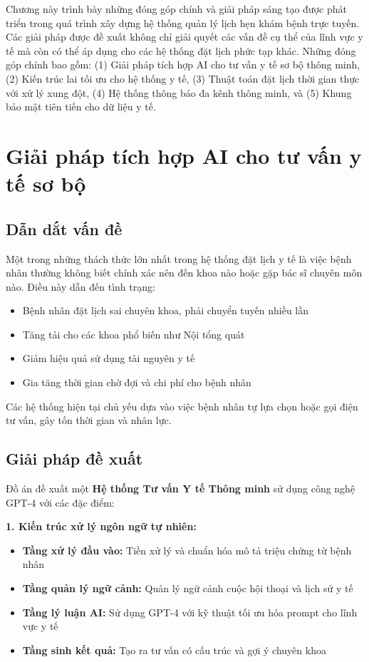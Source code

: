 \documentclass[../DoAn.tex]{subfiles}
\begin{document}
Chương này trình bày những đóng góp chính và giải pháp sáng tạo được phát triển trong quá trình xây dựng hệ thống quản lý lịch hẹn khám bệnh trực tuyến. Các giải pháp được đề xuất không chỉ giải quyết các vấn đề cụ thể của lĩnh vực y tế mà còn có thể áp dụng cho các hệ thống đặt lịch phức tạp khác. Những đóng góp chính bao gồm: (1) Giải pháp tích hợp AI cho tư vấn y tế sơ bộ thông minh, (2) Kiến trúc lai tối ưu cho hệ thống y tế, (3) Thuật toán đặt lịch thời gian thực với xử lý xung đột, (4) Hệ thống thông báo đa kênh thông minh, và (5) Khung bảo mật tiên tiến cho dữ liệu y tế.

\section{Giải pháp tích hợp AI cho tư vấn y tế sơ bộ}
\label{section:5.1}

\subsection{Dẫn dắt vấn đề}

Một trong những thách thức lớn nhất trong hệ thống đặt lịch y tế là việc bệnh nhân thường không biết chính xác nên đến khoa nào hoặc gặp bác sĩ chuyên môn nào. Điều này dẫn đến tình trạng:

\begin{itemize}
    \item Bệnh nhân đặt lịch sai chuyên khoa, phải chuyển tuyến nhiều lần
    \item Tăng tải cho các khoa phổ biến như Nội tổng quát
    \item Giảm hiệu quả sử dụng tài nguyên y tế
    \item Gia tăng thời gian chờ đợi và chi phí cho bệnh nhân
\end{itemize}

Các hệ thống hiện tại chủ yếu dựa vào việc bệnh nhân tự lựa chọn hoặc gọi điện tư vấn, gây tốn thời gian và nhân lực.

\subsection{Giải pháp đề xuất}

Đồ án đề xuất một \textbf{Hệ thống Tư vấn Y tế Thông minh} sử dụng công nghệ GPT-4 với các đặc điểm:

\textbf{1. Kiến trúc xử lý ngôn ngữ tự nhiên:}
\begin{itemize}
    \item \textbf{Tầng xử lý đầu vào:} Tiền xử lý và chuẩn hóa mô tả triệu chứng từ bệnh nhân
    \item \textbf{Tầng quản lý ngữ cảnh:} Quản lý ngữ cảnh cuộc hội thoại và lịch sử y tế
    \item \textbf{Tầng lý luận AI:} Sử dụng GPT-4 với kỹ thuật tối ưu hóa prompt cho lĩnh vực y tế
    \item \textbf{Tầng sinh kết quả:} Tạo ra tư vấn có cấu trúc và gợi ý chuyên khoa
\end{itemize}
\end{document}
